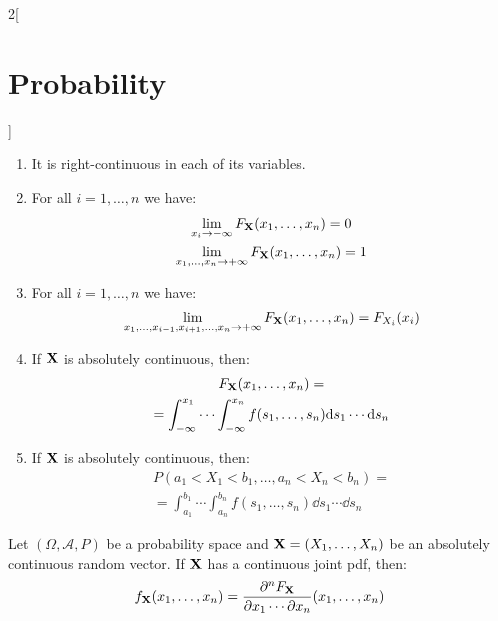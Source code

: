 \documentclass[../../../main.tex]{subfiles}
\begin{document}
\begin{multicols}{2}[\section{Probability}]
\begin{prop}
\begin{enumerate}
      \item It is right-continuous in each of its variables.
      \item For all $i=1,\ldots,n$ we have:
            \begin{gather*}
              \lim_{x_i\to-\infty}F_{\boldsymbol{\mathrm{X}}}(x_1,\ldots,x_n)=0\\
              \lim_{x_1,\ldots,x_n\to+\infty}F_{\boldsymbol{\mathrm{X}}}(x_1,\ldots,x_n)=1
            \end{gather*}
      \item For all $i=1,\ldots,n$ we have: $$\lim_{x_1,\ldots,x_{i-1},x_{i+1},\ldots,x_n\to+\infty}F_{\boldsymbol{\mathrm{X}}}(x_1,\ldots,x_n)=F_{X_i}(x_i)$$
      \item If $\boldsymbol{\mathrm{X}}$ is absolutely continuous, then:
            \begin{multline*}
              F_{\boldsymbol{\mathrm{X}}}(x_1,\ldots,x_n)=\\=\int_{-\infty}^{x_1}\cdots\int_{-\infty}^{x_n} f(s_1,\ldots,s_n)\dd s_1\cdots\dd s_n
            \end{multline*}
      \item If $\boldsymbol{\mathrm{X}}$ is absolutely continuous, then:
            \begin{multline*}
              P(a_1<X_1<b_1,\ldots,a_n<X_n<b_n)=\\=\int_{a_1}^{b_1}\cdots\int_{a_n}^{b_n} f(s_1,\ldots,s_n)\dd s_1\cdots\dd s_n
            \end{multline*}
    \end{enumerate}
  \end{prop}
  \begin{prop}
    Let $(\Omega,\mathcal{A},P)$ be a probability space and $\boldsymbol{\mathrm{X}}=(X_1,\ldots,X_n)$ be an absolutely continuous random vector. If $\boldsymbol{\mathrm{X}}$ has a continuous joint pdf, then: $$f_{\boldsymbol{\mathrm{X}}}(x_1,\ldots,x_n)=\frac{\partial^nF_{\boldsymbol{\mathrm{X}}}}{\partial x_1\cdots\partial x_n}(x_1,\ldots,x_n)$$
  \end{prop}

\end{multicols}
\end{document}
